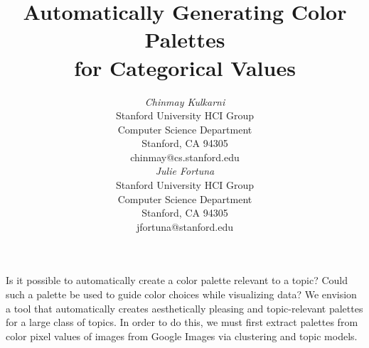 \documentclass{article}
\begin{document}

 \toappear{}


\title{Automatically Generating Color Palettes\\for Categorical Values}


\author{
\parbox[t]{9cm}{\centering
	     {\em Chinmay Kulkarni}\\
	     Stanford University HCI Group\\
              Computer Science Department\\
	     Stanford, CA 94305\\
	     chinmay@cs.stanford.edu}
\parbox[t]{9cm}{\centering
	     {\em Julie Fortuna}\\
	     Stanford University HCI Group\\
              Computer Science Department\\
	     Stanford, CA 94305\\
	     jfortuna@stanford.edu}
}

\maketitle

\abstract
Is it possible to automatically create a color palette relevant to a topic? Could such a palette be used to guide color choices while visualizing data? We envision a tool that automatically creates aesthetically pleasing and topic-relevant palettes for a large class of topics. In order to do this, we must first extract palettes from color pixel values of images from Google Images via clustering and topic models. 

\end{document}
